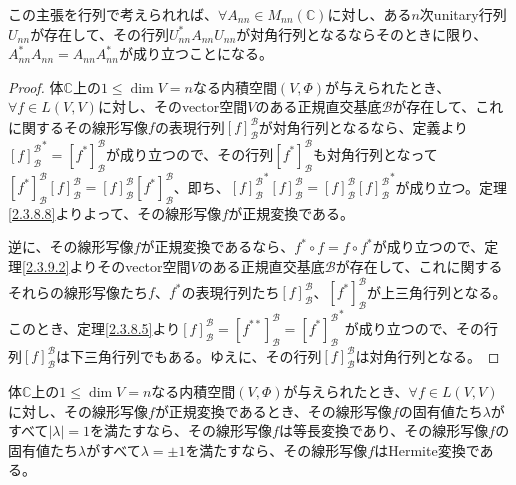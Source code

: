 \documentclass[dvipdfmx]{jsarticle}
\begin{document}
この主張を行列で考えられれば、$\forall A_{nn} \in M_{nn}\left( \mathbb{C} \right)$に対し、ある$n$次unitary行列$U_{nn}$が存在して、その行列$U_{nn}^{*}A_{nn}U_{nn}$が対角行列となるならそのときに限り、$A_{nn}^{*}A_{nn} = A_{nn}A_{nn}^{*}$が成り立つことになる。
\begin{proof}
体$\mathbb{C}$上の$1 \leq \dim V = n$なる内積空間$(V,\varPhi)$が与えられたとき、$\forall f \in L(V,V)$に対し、そのvector空間$V$のある正規直交基底$\mathcal{B}$が存在して、これに関するその線形写像$f$の表現行列$[ f]_{\mathcal{B}}^{\mathcal{B}}$が対角行列となるなら、定義より${[ f]_{\mathcal{B}}^{\mathcal{B}}}^{*} = \left[ f^{*} \right]_{\mathcal{B}}^{\mathcal{B}}$が成り立つので、その行列$\left[ f^{*} \right]_{\mathcal{B}}^{\mathcal{B}}$も対角行列となって$\left[ f^{*} \right]_{\mathcal{B}}^{\mathcal{B}}[ f]_{\mathcal{B}}^{\mathcal{B}} = [ f]_{\mathcal{B}}^{\mathcal{B}}\left[ f^{*} \right]_{\mathcal{B}}^{\mathcal{B}}$、即ち、${[ f]_{\mathcal{B}}^{\mathcal{B}}}^{*}[ f]_{\mathcal{B}}^{\mathcal{B}} = [ f]_{\mathcal{B}}^{\mathcal{B}}{[ f]_{\mathcal{B}}^{\mathcal{B}}}^{*}$が成り立つ。定理\ref{2.3.8.8}よりよって、その線形写像$f$が正規変換である。\par
逆に、その線形写像$f$が正規変換であるなら、$f^{*} \circ f = f \circ f^{*}$が成り立つので、定理\ref{2.3.9.2}よりそのvector空間$V$のある正規直交基底$\mathcal{B}$が存在して、これに関するそれらの線形写像たち$f$、$f^{*}$の表現行列たち$[ f]_{\mathcal{B}}^{\mathcal{B}}$、$\left[ f^{*} \right]_{\mathcal{B}}^{\mathcal{B}}$が上三角行列となる。このとき、定理\ref{2.3.8.5}より$[ f]_{\mathcal{B}}^{\mathcal{B}} = \left[ f^{**} \right]_{\mathcal{B}}^{\mathcal{B}} = {\left[ f^{*} \right]_{\mathcal{B}}^{\mathcal{B}}}^{*}$が成り立つので、その行列$[ f]_{\mathcal{B}}^{\mathcal{B}}$は下三角行列でもある。ゆえに、その行列$[ f]_{\mathcal{B}}^{\mathcal{B}}$は対角行列となる。
\end{proof}
\begin{thm}\label{2.3.9.5}
体$\mathbb{C}$上の$1 \leq \dim V = n$なる内積空間$(V,\varPhi)$が与えられたとき、$\forall f \in L(V,V)$に対し、その線形写像$f$が正規変換であるとき、その線形写像$f$の固有値たち$\lambda$がすべて$|\lambda| = 1$を満たすなら、その線形写像$f$は等長変換であり、その線形写像$f$の固有値たち$\lambda$がすべて$\lambda = \pm 1$を満たすなら、その線形写像$f$はHermite変換である。
\end{thm}
\end{document}

